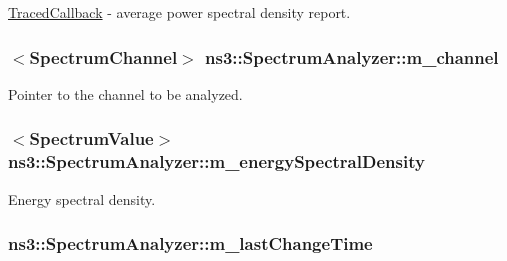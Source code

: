 \hyperlink{classns3_1_1TracedCallback}{Traced\+Callback} -\/ average power spectral density report. 

\subsubsection[{\texorpdfstring{m\+\_\+channel}{m_channel}}]{$<${\bf Spectrum\+Channel}$>$ ns3\+::\+Spectrum\+Analyzer\+::m\+\_\+channel\hspace{0.3cm}{\ttfamily [private]}}\hypertarget{classns3_1_1SpectrumAnalyzer_a479bd87363c1b8e85d5a24245a20d59e}{}\label{classns3_1_1SpectrumAnalyzer_a479bd87363c1b8e85d5a24245a20d59e}


Pointer to the channel to be analyzed. 

\subsubsection[{\texorpdfstring{m\+\_\+energy\+Spectral\+Density}{m_energySpectralDensity}}]{$<${\bf Spectrum\+Value}$>$ ns3\+::\+Spectrum\+Analyzer\+::m\+\_\+energy\+Spectral\+Density\hspace{0.3cm}{\ttfamily [private]}}\hypertarget{classns3_1_1SpectrumAnalyzer_a96ebbaef00134ba6563ef25946a679aa}{}\label{classns3_1_1SpectrumAnalyzer_a96ebbaef00134ba6563ef25946a679aa}


Energy spectral density. 

\subsubsection[{\texorpdfstring{m\+\_\+last\+Change\+Time}{m_lastChangeTime}}]{ ns3\+::\+Spectrum\+Analyzer\+::m\+\_\+last\+Change\+Time\hspace{0.3cm}{\ttfamily [private]}}\hypertarget{classns3_1_1SpectrumAnalyzer_a80271bf4f5d1e289f49dd3261d8b573d}{}\label{classns3_1_1SpectrumAnalyzer_a80271bf4f5d1e289f49dd3261d8b573d}


